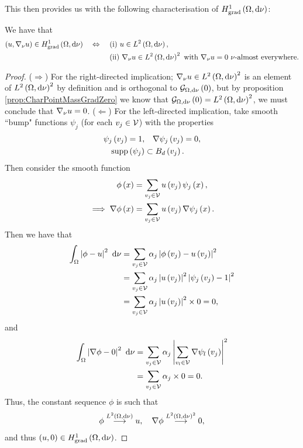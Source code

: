 This then provides us with the following characterisation of $H^1_\mathrm{grad}\left( \Omega, \mathrm{d}\nu \right)$:
\begin{cory} \label{eq:CharPointMassSpace}
	We have that
	\begin{align*}
		\bracs{u,\grad_{\nu}u}\in\gradSob{\ddom}{\nu} \quad\Leftrightarrow\quad 
		& \ \text{(i)} \ u\in\ltwo{\ddom}{\nu}, \\
		& \ \text{(ii)} \ \grad_{\nu}u\in\ltwo{\ddom}{\nu}^2 \ \text{with} \ \grad_{\nu}u = 0 \ \nu\text{-almost everywhere}.
	\end{align*}
\end{cory}
\begin{proof}
	($\Rightarrow$) For the right-directed implication; $\nabla_{\nu}u\in L^{2}\left( \Omega,\mathrm{d}\nu \right)^2$ is an element of $L^{2}\left( \Omega,\mathrm{d}\nu \right)^2$ by definition and is orthogonal to $\mathcal{G}_{ \Omega, \mathrm{d}\nu}\left( 0 \right)$, but by proposition \ref{prop:CharPointMassGradZero} we know that $\mathcal{G}_{ \Omega, \mathrm{d}\nu}\left( 0 \right)=L^{2}\left( \Omega,\mathrm{d}\nu \right)^2$, we must conclude that $\nabla_{\nu}u = 0$. \newline
	($\Leftarrow$) For the left-directed implication, take smooth ``bump" functions $\psi_j$ (for each $v_j\in\mathcal{V}$) with the properties
	\begin{align*}
		\psi_j\left( v_j \right) = 1, &\quad \nabla\psi_j\left( v_j \right) = 0, \\
		\mathrm{supp}\left( \psi_j \right) &\subset B_{d}\left( v_j \right).
	\end{align*}
	Then consider the smooth function
	\begin{align*}
		\phi\left( x \right) &= \sum_{v_j\in\mathcal{V}} u\left( v_j \right)\psi_j\left( x \right), \\
		\implies \nabla\phi\left( x \right) &= \sum_{v_j\in\mathcal{V}} u\left( v_j \right)\nabla\psi_j\left( x \right).
	\end{align*}
	Then we have that
	\begin{align*}
		\int_{\Omega}\left\lvert \phi - u \right\rvert^2 \ \mathrm{d}\nu &= \sum_{v_j\in\mathcal{V}} \alpha_j\left\lvert \phi\left( v_j \right) - u\left( v_j \right) \right\rvert^2 \\
		&= \sum_{v_j\in\mathcal{V}} \alpha_j\left\lvert u\left( v_j \right) \right\rvert^2\left\lvert \psi_j\left( v_j \right)-1 \right\rvert^2 \\
		&= \sum_{v_j\in\mathcal{V}} \alpha_j\left\lvert u\left( v_j \right) \right\rvert^2 \times 0 = 0,
	\end{align*}
	and
	\begin{align*}
		\int_{\Omega}\left\lvert \nabla\phi - 0 \right\rvert^2 \ \mathrm{d}\nu &= \sum_{v_j\in\mathcal{V}} \alpha_j\left\lvert  \sum_{v_l\in\mathcal{V}} \nabla\psi_l\left( v_j \right)  \right\rvert^2 \\
		&= \sum_{v_j\in\mathcal{V}} \alpha_j \times 0 = 0.
	\end{align*}
	Thus, the constant sequence $\phi$ is such that
	\begin{align*}
		\phi \overset{L^{2}\left( \Omega,\mathrm{d}\nu \right)}{\longrightarrow} u, \quad \nabla\phi \overset{L^{2}\left( \Omega,\mathrm{d}\nu \right)^2}{\longrightarrow} 0,
	\end{align*}
	and thus $\left( u,0 \right)\in H^1_\mathrm{grad}\left( \Omega, \mathrm{d}\nu \right)$.
\end{proof}

